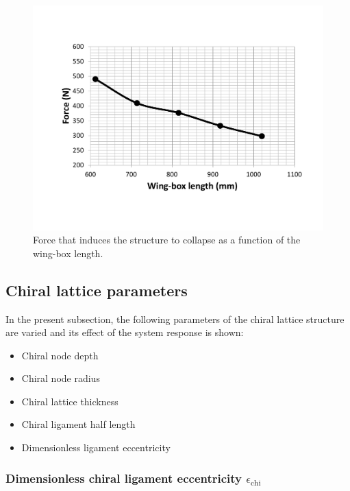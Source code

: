     \begin{figure}[!htpb] %
      \centering
      \includegraphics[width=0.8 \textwidth]{figures/../figures/result-sim/N/force_N}
      \caption[Force that induces the structure to collapse as a function of the wing-box length]{Force that induces the structure to collapse as a function of the wing-box length.}\label{fig:force_N}
    \end{figure}

  \clearpage
  \subsection{Chiral lattice parameters} \label{subsec:chiral_para}

    In the present subsection, the following parameters of the chiral lattice structure are varied and its effect of the system response is shown:

    \begin{itemize}
      \item Chiral node depth \chiB
      \item Chiral node radius \chir
      \item Chiral lattice thickness \chit
      \item Chiral ligament half length \chiL
      \item Dimensionless ligament eccentricity \chie
    \end{itemize}

    \subsubsection{Dimensionless chiral ligament eccentricity $\epsilon_{\mathrm{chi}}$}

